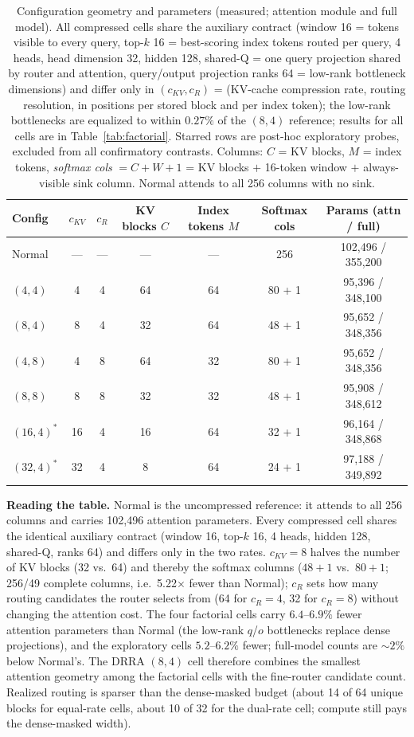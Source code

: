 \begin{table}[t]
\centering
\small
\caption{Configuration geometry and parameters (measured; attention module
and full model). All compressed cells share the auxiliary contract
(window 16 = tokens visible to every query, top-$k$ 16 = best-scoring index
tokens routed per query, 4 heads, head dimension 32, hidden 128, shared-Q
= one query projection shared by router and attention,
query/output projection ranks 64 = low-rank bottleneck dimensions) and differ only in
$(c_{KV}, c_R)$ = (KV-cache compression rate, routing resolution, in
positions per stored block and per index token); the low-rank
bottlenecks are equalized to within $0.27\%$ of the $(8,4)$ reference;
results for all cells are in Table~\ref{tab:factorial}. Starred rows are post-hoc exploratory probes, excluded from
all confirmatory contrasts. Columns: $C$ = KV blocks, $M$ = index tokens,
\emph{softmax cols} $= C + W + 1$ = KV blocks $+$ 16-token window $+$
always-visible sink column. Normal
attends to all 256 columns with no sink.}
\label{tab:configs}
\begin{tabular}{lcccccc}
\toprule
Config & $c_{KV}$ & $c_R$ & KV blocks $C$ & Index tokens $M$ & Softmax cols & Params (attn / full) \\
\midrule
Normal & --- & --- & --- & --- & 256 & 102{,}496 / 355{,}200 \\
$(4,4)$ & 4 & 4 & 64 & 64 & 80 + 1 & 95{,}396 / 348{,}100 \\
$(8,4)$ & 8 & 4 & 32 & 64 & 48 + 1 & 95{,}652 / 348{,}356 \\
$(4,8)$ & 4 & 8 & 64 & 32 & 80 + 1 & 95{,}652 / 348{,}356 \\
$(8,8)$ & 8 & 8 & 32 & 32 & 48 + 1 & 95{,}908 / 348{,}612 \\
$(16,4)^*$ & 16 & 4 & 16 & 64 & 32 + 1 & 96{,}164 / 348{,}868 \\
$(32,4)^*$ & 32 & 4 & 8 & 64 & 24 + 1 & 97{,}188 / 349{,}892 \\
\bottomrule
\end{tabular}
\end{table}

\textbf{Reading the table.} Normal is the uncompressed reference: it
attends to all 256 columns and carries 102{,}496 attention parameters.
Every compressed cell shares the identical auxiliary contract (window 16,
top-$k$ 16, 4 heads, hidden 128, shared-Q, ranks 64) and differs only in
the two rates. $c_{KV}{=}8$ halves the number of KV blocks (32 vs.\ 64) and
thereby the softmax columns ($48{+}1$ vs.\ $80{+}1$; 256/49 complete columns,
i.e.\ 5.22$\times$
fewer than Normal); $c_R$ sets how many routing candidates the router
selects from (64 for $c_R{=}4$, 32 for $c_R{=}8$) without changing the
attention cost. The four factorial cells carry $6.4$--$6.9\%$ fewer attention
parameters than Normal (the low-rank $q$/$o$ bottlenecks replace dense
projections), and the exploratory cells $5.2$--$6.2\%$ fewer; full-model counts
are ${\sim}2\%$ below Normal's. The DRRA $(8,4)$ cell therefore combines the smallest attention geometry among the
factorial cells with the fine-router candidate count. Realized routing is sparser than the dense-masked budget (about 14 of 64 unique blocks for equal-rate cells, about 10 of 32 for the dual-rate cell; compute still pays the dense-masked width).

